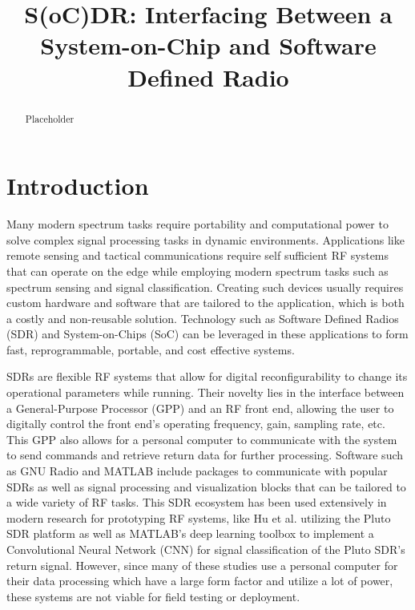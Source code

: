 \documentclass[conference]{IEEEtran}
\begin{document}
\title{S(oC)DR: Interfacing Between a System-on-Chip and Software Defined Radio\\
}

\author{
}

\maketitle

\begin{abstract}
Placeholder
\end{abstract}

\section{Introduction}
Many modern spectrum tasks require portability and computational power to solve complex signal processing tasks in dynamic environments.
Applications like remote sensing and tactical communications require self sufficient RF systems that can operate on the edge while employing
modern spectrum tasks such as spectrum sensing and signal classification. Creating such devices usually requires
custom hardware and software that are tailored to the application, which is both a costly and non-reusable solution. Technology such as
Software Defined Radios (SDR) and System-on-Chips (SoC) can be leveraged in these applications to form fast, reprogrammable, portable, and cost effective systems.

SDRs are flexible RF systems that allow for digital reconfigurability to change its operational parameters while running.
Their novelty lies in the interface between a General-Purpose Processor (GPP) and an RF front end, allowing the user to digitally control the front end's
operating frequency, gain, sampling rate, etc. This GPP also allows for a personal computer to communicate with the system to send commands and retrieve return
data for further processing. Software such as GNU Radio and MATLAB include packages to communicate with popular SDRs as well as signal processing and visualization
blocks that can be tailored to a wide variety of RF tasks. This SDR ecosystem has been used extensively in modern research for prototyping RF systems,
like Hu et al. utilizing the Pluto SDR platform as well as MATLAB's deep learning toolbox to implement a Convolutional Neural Network (CNN) 
for signal classification of the Pluto SDR's return signal. However, since many of these studies use a personal computer for their data processing which have a large form factor 
and utilize a lot of power, these systems are not viable for field testing or deployment. 
\end{document}
